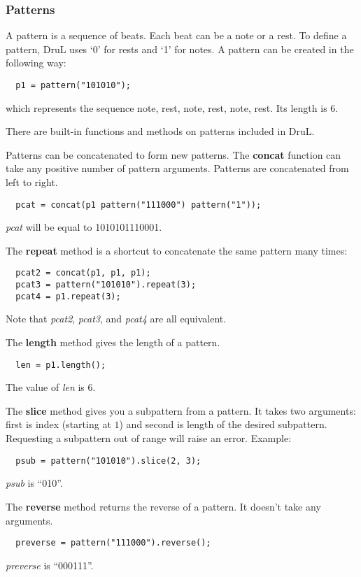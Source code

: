 \subsubsection{Patterns}

A pattern is a sequence of beats.  Each beat can be a note or a rest.
To define a pattern, DruL uses `0' for rests and `1' for notes.
A pattern can be created in the following way:
\begin{verbatim}
  p1 = pattern("101010");
\end{verbatim}
which represents the sequence {note, rest, note, rest, note, rest}.
Its length is $6$.

There are built-in functions and methods on patterns included in DruL.

Patterns can be concatenated to form new patterns.  The \textbf{concat} function can take any positive number of pattern arguments.  Patterns are concatenated from left to right.
\begin{verbatim}
  pcat = concat(p1 pattern("111000") pattern("1"));
\end{verbatim}
\textit{pcat} will be equal to 1010101110001.


The \textbf{repeat} method is a shortcut to concatenate the same pattern many times:
\begin{verbatim}
  pcat2 = concat(p1, p1, p1);
  pcat3 = pattern("101010").repeat(3);
  pcat4 = p1.repeat(3);
\end{verbatim}
Note that \textit{pcat2}, \textit{pcat3}, and \textit{pcat4} are all equivalent.

The \textbf{length} method gives the length of a pattern.
\begin{verbatim}
  len = p1.length();
\end{verbatim}
The value of \textit{len} is $6$.

The \textbf{slice} method gives you a subpattern from a pattern.
It takes two arguments: first is index (starting at $1$) and second is
length of the desired subpattern. Requesting a subpattern out of range will
raise an error.  Example:
\begin{verbatim}
  psub = pattern("101010").slice(2, 3);
\end{verbatim}
\textit{psub} is ``010''.

The \textbf{reverse} method returns the reverse of a pattern.
It doesn't take any arguments.
\begin{verbatim}
  preverse = pattern("111000").reverse();
\end{verbatim}
\textit{preverse} is ``000111''.

